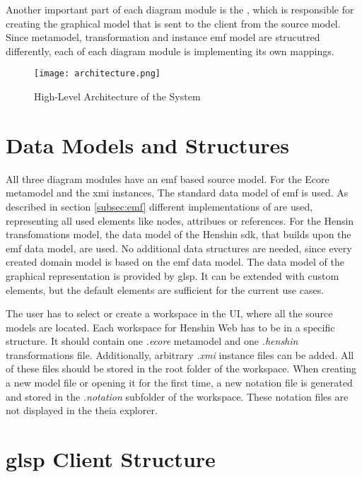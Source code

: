   Another important part of each diagram module is the , which is responsible for creating the graphical model that is sent to the client from the source model. Since metamodel, transformation and instance \ac{emf} model are strucutred differently, each  of each diagram module is implementing its own mappings.

  \begin{figure}
    \centering
    \texttt{[image: architecture.png]}
    \caption{High-Level Architecture of the System}
    \label{fig:architecture}
  \end{figure}

 \section{Data Models and Structures}
  \label{subsec:data-models}

  All three diagram modules have an \ac{emf} based source model. For the Ecore metamodel and the \ac{xmi} instances, The standard data model of \ac{emf} is used. As described in section \ref{subsec:emf} different implementations of  are used, representing all used elements like nodes, attribues or references. For the Hensin transfomations model, the data model of the Henshin \ac{sdk}, that builds upon the \ac{emf} data model, are used. No additional data structures are needed, since every created domain model is based on the \ac{emf} data model. The data model of the graphical representation is provided by \ac{glsp}. It can be extended with custom elements, but the default elements are sufficient for the current use cases. 

  The user has to select or create a workspace in the UI, where all the source models are located. Each workspace for Henshin Web has to be in a specific structure. It should contain one \textit{.ecore} metamodel and one \textit{.henshin} transformations file. Additionally, arbitrary \textit{.xmi} instance files can be added. All of these files should be stored in the root folder of the workspace. When creating a new model file or opening it for the first time, a new notation file is generated and stored in the \textit{.notation} subfolder of the workspace. These notation files are not displayed in the theia explorer.  

 \section{\ac{glsp} Client Structure}
  \label{subsec:component-design}


